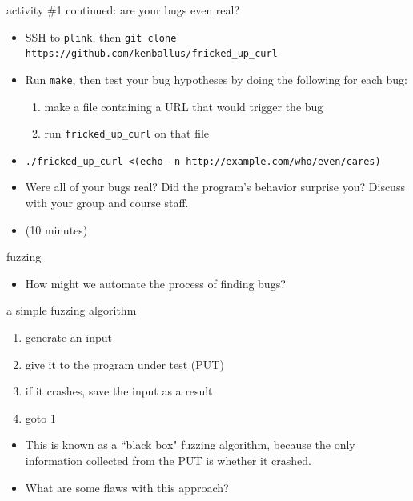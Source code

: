 \documentclass[hyphens,aspectratio=169,dvipsnames]{beamer}
\begin{document}
\begin{frame}[fragile]{activity \#1 continued: are your bugs even real?}
    \begin{itemize}
        \pause \item SSH to \texttt{plink}, then \texttt{git clone https://github.com/kenballus/fricked\_up\_curl}
        \pause \item Run \texttt{make}, then test your bug hypotheses by doing the following for each bug:
            \begin{enumerate}
                \pause \item make a file containing a URL that would trigger the bug
                \pause \item run \texttt{fricked\_up\_curl} on that file
            \end{enumerate}
        \pause \item \texttt{./fricked\_up\_curl <(echo -n http://example.com/who/even/cares)}
        \pause \item Were all of your bugs real? Did the program's behavior surprise you? Discuss with your group and course staff.
        \pause \item (10 minutes)
    \end{itemize}
\end{frame}


\begin{frame}[fragile]{fuzzing}
    \begin{itemize}
        \pause \item How might we automate the process of finding bugs?
    \end{itemize}
\end{frame}

\begin{frame}[fragile]{a simple fuzzing algorithm}
    \begin{enumerate}
        \pause \item generate an input
        \pause \item give it to the program under test (PUT)
        \pause \item if it crashes, save the input as a result
        \pause \item goto 1
    \end{enumerate}

    \begin{itemize}
        \pause \item This is known as a ``black box" fuzzing algorithm, because the only information collected from the PUT is whether it crashed.
        \pause \item What are some flaws with this approach?
    \end{itemize}
\end{frame}
\end{document}
